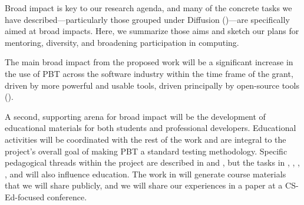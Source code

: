 {

\immediate\closeout\workplanfile






Broad impact is key to our research agenda, and many of the concrete
tasks we have described---particularly those grouped under Diffusion
()---are specifically aimed at broad
impacts.  Here, we summarize those aims and sketch our plans for
mentoring, diversity, and broadening participation in computing.

\smallskip
{} The main broad impact from the
proposed work will be a significant increase in the use of PBT across
the software industry within the time frame of the grant, driven
by more powerful and usable tools, driven principally by open-source
tools ().

\smallskip
{}
%
A second, supporting arena for broad impact will be the
development of educational materials for both students and
professional developers. Educational activities will be
coordinated with the rest of the work and are integral to the
project's overall goal of making PBT a standard testing methodology.
Specific pedagogical
threads within the project are described in  and , but the
tasks in , ,
, , and
 will also influence education. The
work in  will generate course materials that we will
share publicly, and we will share our experiences in a paper at a
CS-Ed-focused conference.

}
